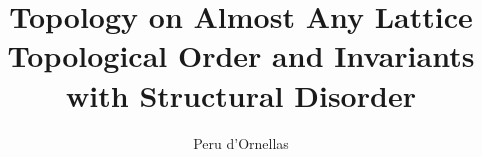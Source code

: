 \documentclass[a4paper,12pt,twoside]{report}
\begin{document}

\title{
    \LARGE Topology on Almost Any Lattice\\
    \vspace*{6mm}  
    {\normalfont \large Topological Order and Invariants with Structural Disorder}\\
}

\author{Peru d'Ornellas} 

\narrowlinespacing

\maketitle

\preface



\end{document}
